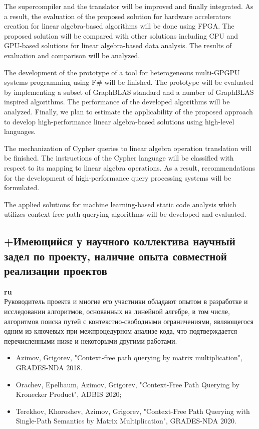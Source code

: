 \documentclass[12pt]{article}  %
\theoremstyle{remark}
\begin{document}
The supercompiler and the translator will be improved and finally integrated. As a result, the evaluation of the proposed solution for hardware accelerators creation for linear algebra-based algorithms will be done using FPGA. The proposed solution will be compared with other solutions including CPU and GPU-based solutions for linear algebra-based data analysis. The results of evaluation and comparison will be analyzed. 

The development of the prototype of a tool for heterogeneous multi-GPGPU systems programming using F# will be finished. The prototype will be evaluated by implementing a subset of GraphBLAS standard and a number of GraphBLAS inspired algorithms. The performance of the developed algorithms will be analyzed. Finally, we plan to estimate the applicability of the proposed approach to develop high-performance linear algebra-based solutions using high-level languages.

The mechanization of Cypher queries to linear algebra operation translation will be finished. The instructions of the Cypher language will be classified with respect to its mapping to linear algebra operations. As a result, recommendations for the development of high-performance query processing systems will be formulated.

The applied solutions for machine learning-based static code analysis which utilizes context-free path querying algorithms will be developed and evaluated. 

\subsection{+Имеющийся у научного коллектива научный задел по проекту, наличие опыта совместной реализации проектов}

\textbf{ru}\\

Руководитель проекта и многие его участники обладают опытом в разработке и исследовании алгоритмов, основанных на линейной алгебре, в том числе, алгоритмов поиска путей с контекстно-свободными ограничениями, являющегося одним из ключевых при межпроцедурном анализе кода, что подтверждается перечисленными ниже и некоторыми другими работами.
\begin{itemize}
  \item Azimov, Grigorev, "Context-free path querying by matrix multiplication", GRADES-NDA 2018.
  \item Orachev, Epelbaum, Azimov, Grigorev, "Context-Free Path Querying by Kronecker Product", ADBIS 2020;
  \item Terekhov, Khoroshev, Azimov, Grigorev, "Context-Free Path Querying with Single-Path Semantics by Matrix Multiplication", GRADES-NDA 2020.
\end{itemize}
\end{document}
